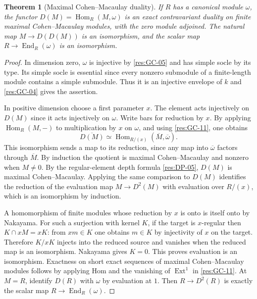\documentclass[11pt,oneside,openany]{book}
\newtheorem{theorem}{Theorem}[chapter]
\theoremstyle{definition}
\theoremstyle{remark}
\begin{document}
\begin{theorem}[Maximal Cohen--Macaulay duality]\label{res:GC-12}
If $R$ has a canonical module $\omega$, the functor
$D(M)=\operatorname{Hom}_R(M,\omega)$ is an exact
contravariant duality on finite maximal Cohen--Macaulay
modules, with the zero module adjoined. The natural map
$M\to D(D(M))$ is an isomorphism, and the scalar map
$R\to\operatorname{End}_R(\omega)$ is an isomorphism.
\end{theorem}
\begin{proof}
In dimension zero, $\omega$ is injective by \ref{res:GC-05}
and has simple socle by its type. Its simple socle is
essential since every nonzero submodule of a finite-length
module contains a simple submodule. Thus it is an injective
envelope of $k$ and \ref{res:GC-04} gives the assertion.

In positive dimension choose a first parameter $x$. The
element acts injectively on $D(M)$ since it acts injectively
on $\omega$. Write bars for reduction by $x$.
By applying $\operatorname{Hom}_R(M,-)$ to multiplication
by $x$ on $\omega$, and using \ref{res:GC-11}, one obtains
\[
 \overline{D(M)}
 \simeq \operatorname{Hom}_{R/(x)}(\overline M,\overline\omega).
\]
This isomorphism sends a map to its reduction, since any
map into $\overline\omega$ factors through $\overline M$.
By induction the quotient is maximal Cohen--Macaulay and
nonzero when $M\ne0$. By the regular-element depth formula
\ref{res:DP-05}, $D(M)$ is maximal Cohen--Macaulay. Applying
the same comparison to $D(M)$ identifies the reduction
of the evaluation map $M\to D^2(M)$ with evaluation over
$R/(x)$, which is an isomorphism by induction.

A homomorphism of finite modules whose reduction by $x$
is onto is itself onto by Nakayama. For such a surjection
with kernel $K$, if the target is $x$-regular then
$K\cap xM=xK$: from $xm\in K$ one obtains $m\in K$ by
injectivity of $x$ on the target. Therefore $K/xK$
injects into the reduced source and vanishes when the
reduced map is an isomorphism. Nakayama gives $K=0$.
This proves evaluation is an isomorphism. Exactness on
short exact sequences of maximal Cohen--Macaulay modules
follows by applying Hom and the vanishing of $\operatorname{Ext}^1$
in \ref{res:GC-11}. At $M=R$, identify $D(R)$ with
$\omega$ by evaluation at $1$. Then $R\to D^2(R)$ is
exactly the scalar map $R\to\operatorname{End}_R(\omega)$.
\end{proof}
\end{document}
